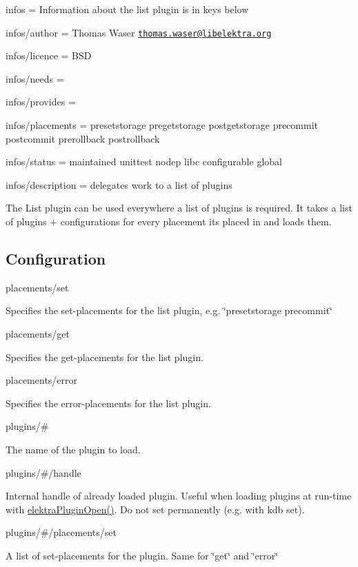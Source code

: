 
\begin{DoxyItemize}
\item infos = Information about the list plugin is in keys below
\item infos/author = Thomas Waser \href{mailto:thomas.waser@libelektra.org}{\tt thomas.\+waser@libelektra.\+org}
\item infos/licence = B\+SD
\item infos/needs =
\item infos/provides =
\item infos/placements = presetstorage pregetstorage postgetstorage precommit postcommit prerollback postrollback
\item infos/status = maintained unittest nodep libc configurable global
\item infos/description = delegates work to a list of plugins
\end{DoxyItemize}

The List plugin can be used everywhere a list of plugins is required. It takes a list of plugins + configurations for every placement it\textquotesingle{}s placed in and loads them.

\subsection*{Configuration}

{\ttfamily placements/set}

Specifies the set-\/placements for the list plugin, e.\+g. \char`\"{}presetstorage precommit\char`\"{}

{\ttfamily placements/get}

Specifies the get-\/placements for the list plugin.

{\ttfamily placements/error}

Specifies the error-\/placements for the list plugin.

{\ttfamily plugins/\#}

The name of the plugin to load.

{\ttfamily plugins/\#/handle}

Internal handle of already loaded plugin. Useful when loading plugins at run-\/time with {\ttfamily \hyperlink{elektra_2plugin_8c_a32a70a7876542c51d153164ac5108a57}{elektra\+Plugin\+Open()}}. Do not set permanently (e.\+g. with {\ttfamily kdb set}).

{\ttfamily plugins/\#/placements/set}

A list of set-\/placements for the plugin. Same for \char`\"{}get\char`\"{} and \char`\"{}error\char`\"{}

